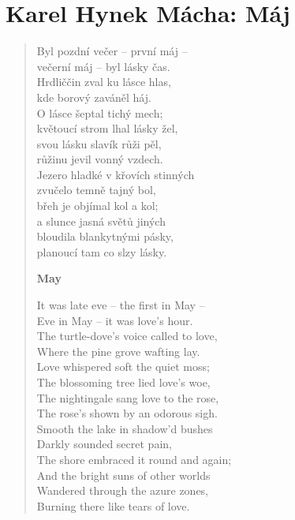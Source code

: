 \section{Karel Hynek Mácha: Máj}

\begin{verse}
Byl pozdní večer -- první máj -- \\
večerní máj -- byl lásky čas. \\
Hrdliččin zval ku lásce hlas, \\
kde borový zaváněl háj. \\
O lásce šeptal tichý mech; \\
květoucí strom lhal lásky žel, \\
svou lásku slavík růži pěl, \\
růžinu jevil vonný vzdech. \\
Jezero hladké v křovích stinných \\
zvučelo temně tajný bol, \\
břeh je objímal kol a kol; \\
a slunce jasná světů jiných \\
bloudila blankytnými pásky, \\
planoucí tam co slzy lásky.

\bigskip

\textbf{May}

\smallskip

It was late eve -- the first in May --  \\
Eve in May -- it was love’s hour. \\
The turtle-dove’s voice called to love, \\
Where the pine grove wafting lay. \\
Love whispered soft the quiet moss; \\
The blossoming tree lied love’s woe, \\
The nightingale sang love to the rose, \\
The rose’s shown by an odorous sigh. \\
Smooth the lake in shadow’d bushes \\
Darkly sounded secret pain, \\
The shore embraced it round and again; \\
And the bright suns of other worlds \\
Wandered through the azure zones, \\
Burning there like tears of love. 

\smallskip



\end{verse}
